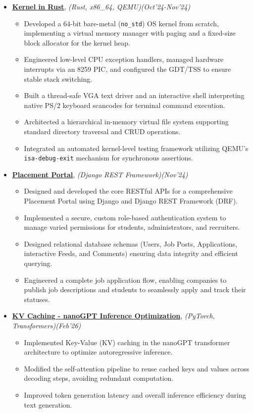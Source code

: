 \documentclass[a4paper,10pt]{article}
\begin{document}
\begin{itemize}
\item \textbf{\href{https://github.com/pratikwadekar88/RustOS}{Kernel in Rust}}, \emph{(Rust, x86\_64, QEMU)}\hfill \emph{(Oct'24-Nov'24)} 
\begin{itemize}
    \item Developed a 64-bit bare-metal (\texttt{no\_std}) OS kernel from scratch, implementing a virtual memory manager with paging and a fixed-size block allocator for the kernel heap.
    \item Engineered low-level CPU exception handlers, managed hardware interrupts via an 8259 PIC, and configured the GDT/TSS to ensure stable stack switching.
    \item Built a thread-safe VGA text driver and an interactive shell interpreting native PS/2 keyboard scancodes for terminal command execution.
    \item Architected a hierarchical in-memory virtual file system supporting standard directory traversal and CRUD operations.
    \item Integrated an automated kernel-level testing framework utilizing QEMU's \texttt{isa-debug-exit} mechanism for synchronous assertions.
\end{itemize}

\item \textbf{\href{https://github.com/pratikwadekar88/PlacementPortal}{Placement Portal}}, \emph{(Django REST Framework)}\hfill \emph{(Nov'24)}
\begin{itemize}
    \item Designed and developed the core RESTful APIs for a comprehensive Placement Portal using Django and Django REST Framework (DRF).
    \item Implemented a secure, custom role-based authentication system to manage varied permissions for students, administrators, and recruiters.
    \item Designed relational database schemas (Users, Job Posts, Applications, interactive Feeds, and Comments) ensuring data integrity and efficient querying.
    \item Engineered a complete job application flow, enabling companies to publish job descriptions and students to seamlessly apply and track their statuses.
\end{itemize}

\item \textbf{\href{https://github.com/pratikwadekar88/sysml-assignments}{KV Caching - nanoGPT Inference Optimization}}, \emph{(PyTorch, Transformers)}\hfill \emph{(Feb'26)}
\begin{itemize}
    \item Implemented Key-Value (KV) caching in the nanoGPT transformer architecture to optimize autoregressive inference.
    \item Modified the self-attention pipeline to reuse cached keys and values across decoding steps, avoiding redundant computation.
    \item Improved token generation latency and overall inference efficiency during text generation.
\end{itemize}


\end{itemize}
\end{document}
